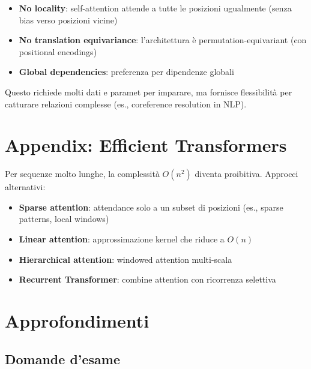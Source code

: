 \begin{itemize}
\item \textbf{No locality}: self-attention attende a tutte le posizioni ugualmente (senza bias verso posizioni vicine)
\item \textbf{No translation equivariance}: l'architettura è permutation-equivariant (con positional encodings)
\item \textbf{Global dependencies}: preferenza per dipendenze globali
\end{itemize}

Questo richiede molti dati e paramet per imparare, ma fornisce flessibilità per catturare relazioni complesse (es., coreference resolution in NLP).

\section{Appendix: Efficient Transformers}

Per sequenze molto lunghe, la complessità $O(n^2)$ diventa proibitiva. Approcci alternativi:

\begin{itemize}
\item \textbf{Sparse attention}: attendance solo a un subset di posizioni (es., sparse patterns, local windows)
\item \textbf{Linear attention}: approssimazione kernel che riduce a $O(n)$
\item \textbf{Hierarchical attention}: windowed attention multi-scala
\item \textbf{Recurrent Transformer}: combine attention con ricorrenza selettiva
\end{itemize}

\section{Approfondimenti}

\subsection{Domande d'esame}

